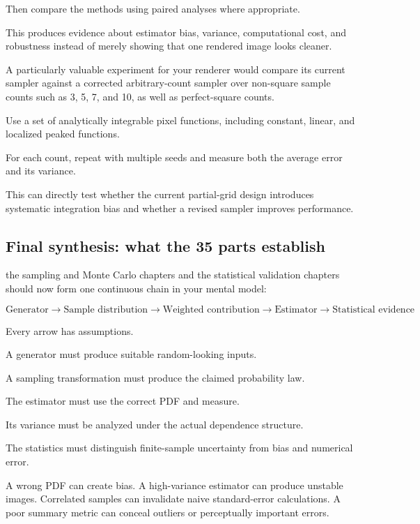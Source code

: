 Then compare the methods using paired analyses where appropriate.

This produces evidence about estimator bias, variance, computational cost, and robustness instead of merely showing that one rendered image looks cleaner.

A particularly valuable experiment for your renderer would compare its current sampler against a corrected arbitrary-count sampler over non-square sample counts such as 3, 5, 7, and 10, as well as perfect-square counts.

Use a set of analytically integrable pixel functions, including constant, linear, and localized peaked functions.

For each count, repeat with multiple seeds and measure both the average error and its variance.

This can directly test whether the current partial-grid design introduces systematic integration bias and whether a revised sampler improves performance.

\subsection{Final synthesis: what the 35 parts establish}\label{02-foundations-ii-ch031-final-synthesis-what-the-35-parts-establish}

the sampling and Monte Carlo chapters and the statistical validation chapters should now form one continuous chain in your mental model:

\[
 \boxed{ \text{Generator} \rightarrow \text{Sample distribution} \rightarrow \text{Weighted contribution} \rightarrow \text{Estimator} \rightarrow \text{Statistical evidence} }
\]

Every arrow has assumptions.

A generator must produce suitable random-looking inputs.

A sampling transformation must produce the claimed probability law.

The estimator must use the correct PDF and measure.

Its variance must be analyzed under the actual dependence structure.

The statistics must distinguish finite-sample uncertainty from bias and numerical error.

A wrong PDF can create bias. A high-variance estimator can produce unstable images. Correlated samples can invalidate naive standard-error calculations. A poor summary metric can conceal outliers or perceptually important errors.


